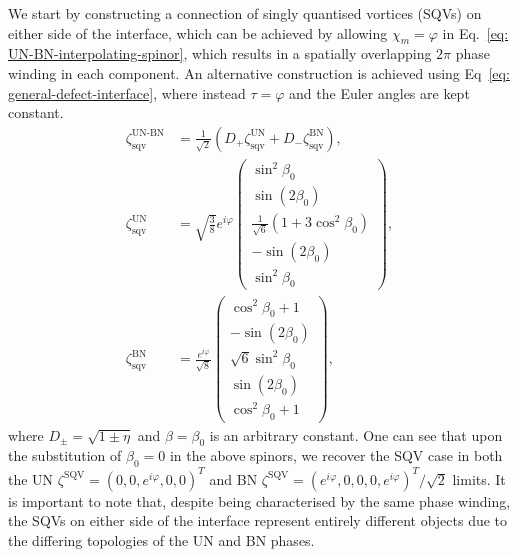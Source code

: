 We start by constructing a connection of singly quantised vortices (SQVs) on
either side of the interface, which can be achieved by allowing
\(\chi_m=\varphi \) in Eq.~\eqref{eq: UN-BN-interpolating-spinor}, which results
in a spatially overlapping \(2\pi \) phase winding in each component.
An alternative construction is achieved using
Eq~\eqref{eq: general-defect-interface}, where instead \(\tau=\varphi \) and the
Euler angles are kept constant.
\begin{align}\label{eq: UN-BN-SQV-SQV}
    \zeta_\text{sqv}^\text{UN-BN} & =
    \frac{1}{\sqrt{2}}\left( D_+\zeta^\text{UN}_\text{sqv}
    + D_-\zeta^\text{BN}_\text{sqv}\right),                       \\
    \zeta^\text{UN}_\text{sqv}    & =
    \sqrt{\frac38}e^{i\varphi}
    \begin{pmatrix}
        \sin^2\beta_0                                   \\
        \sin (2 \beta _0)                               \\
        \frac{1}{\sqrt{6}}\left(1+3\cos^2\beta_0\right) \\
        - \sin (2 \beta _0)                             \\
        \sin^2\beta_0
    \end{pmatrix}, \\
    \zeta^\text{BN}_\text{sqv}    & =
    \frac{e^{i\varphi}}{\sqrt{8}}
    \begin{pmatrix}
        \cos^2\beta_0 + 1     \\
        - \sin (2 \beta _0)   \\
        \sqrt{6}\sin^2\beta_0 \\
        \sin (2 \beta _0)     \\
        \cos^2\beta_0 + 1
    \end{pmatrix},
\end{align}
where \(D_{\pm} = \sqrt{1 \pm \eta}\) and \(\beta=\beta_0\) is an arbitrary
constant.
One can see that upon the substitution of \(\beta_0 = 0\) in the above spinors,
we recover the SQV case in both the UN
\(\zeta^\mathrm{SQV} = {(0,0,e^{i\varphi},0,0)}^T\) and BN
\(\zeta^\mathrm{SQV} = {(e^{i\varphi},0,0,0,e^{i\varphi})}^T/\sqrt{2}\) limits.
It is important to note that, despite being characterised by the same phase
winding, the SQVs on either side of the interface represent entirely different
objects due to the differing topologies of the UN and BN phases.

